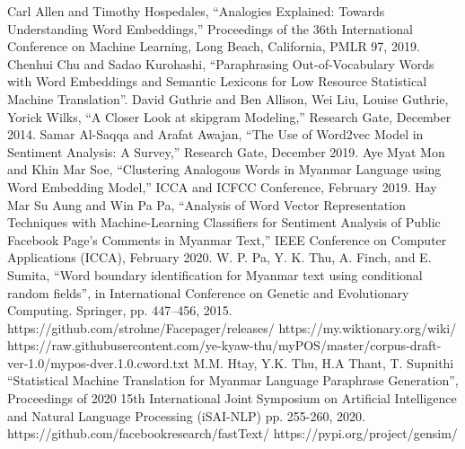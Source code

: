 \documentclass[conference]{IEEEtran}
\begin{document}
\begin{thebibliography}{00}

 Carl Allen and Timothy Hospedales, ``Analogies Explained: Towards Understanding Word Embeddings,'' Proceedings of the 36th International Conference on Machine Learning, Long Beach, California, PMLR 97, 2019.
 Chenhui Chu and Sadao Kurohashi, ``Paraphrasing Out-of-Vocabulary Words with Word Embeddings and Semantic Lexicons for Low Resource Statistical Machine Translation''.
 David Guthrie and Ben Allison, Wei Liu, Louise Guthrie, Yorick Wilks, ``A Closer Look at skipgram Modeling,'' Research Gate, December 2014.
 Samar Al-Saqqa and Arafat Awajan, ``The Use of Word2vec Model in Sentiment Analysis: A Survey,'' Research Gate, December 2019.
 Aye Myat Mon and Khin Mar Soe, ``Clustering Analogous Words in Myanmar Language using Word Embedding Model,'' ICCA and ICFCC Conference, February 2019.
 Hay Mar Su Aung and Win Pa Pa, ``Analysis of Word Vector Representation Techniques with Machine-Learning Classifiers for Sentiment Analysis of Public Facebook Page’s Comments in Myanmar Text,'' IEEE Conference on Computer Applications (ICCA), February 2020.
W. P. Pa, Y. K. Thu, A. Finch, and E. Sumita, ``Word boundary identification for Myanmar text using conditional random fields'', in International Conference on Genetic and Evolutionary Computing.
Springer, pp. 447–456, 2015.
https://github.com/strohne/Facepager/releases/
https://my.wiktionary.org/wiki/
https://raw.githubusercontent.com/ye-kyaw-thu/myPOS/master/corpus-draft-ver-1.0/mypos-dver.1.0.cword.txt
M.M. Htay, Y.K. Thu, H.A Thant, T. Supnithi ``Statistical Machine Translation for Myanmar Language Paraphrase Generation'', Proceedings of 2020 15th International Joint Symposium on Artificial Intelligence and Natural Language Processing (iSAI-NLP) pp. 255-260, 2020.
https://github.com/facebookresearch/fastText/
https://pypi.org/project/gensim/
\end{thebibliography}
\vspace{12pt}
\color{red}
\end{document}
